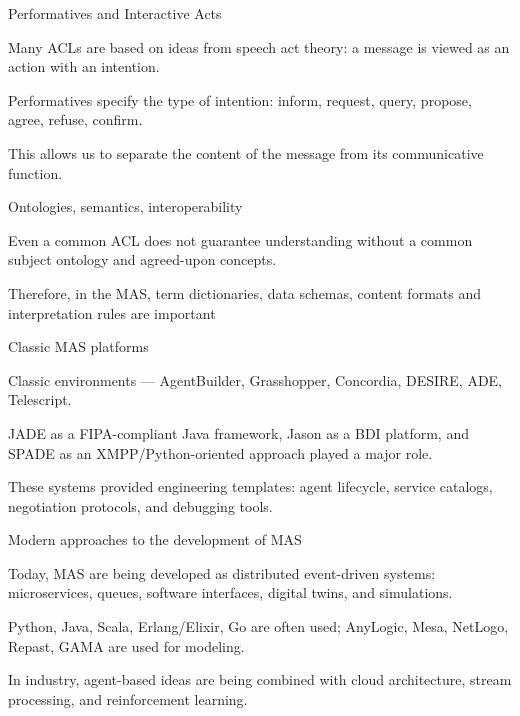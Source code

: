 \begin{frame}{Performatives and Interactive Acts}
	\topline
	\justifying
	\begin{textitemize}
		\item Many ACLs are based on ideas from speech act theory: a message is viewed as an action with an intention.
		\item Performatives specify the type of intention: inform, request, query, propose, agree, refuse, confirm.
		\item This allows us to separate the content of the message from its communicative function.
	\end{textitemize}
\end{frame}

\begin{frame}{Ontologies, semantics, interoperability}
	\topline
	\justifying
	\begin{textitemize}
		\item Even a common ACL does not guarantee understanding without a common subject ontology and agreed-upon concepts.
		\item Therefore, in the MAS, term dictionaries, data schemas, content formats and interpretation rules are important
	\end{textitemize}
\end{frame}

\begin{frame}{Classic MAS platforms}
	\topline
	\justifying
	\begin{textitemize}
		\item Classic environments --- AgentBuilder, Grasshopper, Concordia, DESIRE, ADE, Telescript.
		\item JADE as a FIPA-compliant Java framework, Jason as a BDI platform, and SPADE as an XMPP/Python-oriented approach played a major role.
		\item These systems provided engineering templates: agent lifecycle, service catalogs, negotiation protocols, and debugging tools.
	\end{textitemize}
\end{frame}

\begin{frame}{Modern approaches to the development of MAS}
	\topline
	\justifying
	\begin{textitemize}
		\item Today, MAS are being developed as distributed event-driven systems: microservices, queues, software interfaces, digital twins, and simulations.
		\item Python, Java, Scala, Erlang/Elixir, Go are often used; AnyLogic, Mesa, NetLogo, Repast, GAMA are used for modeling.
		\item In industry, agent-based ideas are being combined with cloud architecture, stream processing, and reinforcement learning.
	\end{textitemize}
\end{frame}

